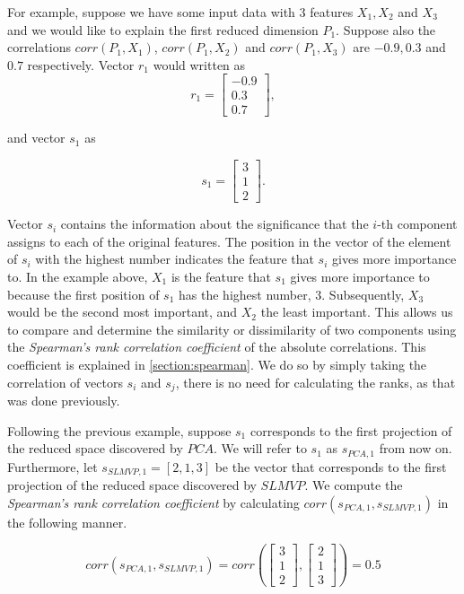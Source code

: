 For example, suppose we have some input data with 3 features $X_1, X_2$ and $X_3$ and we would like to explain the first reduced dimension $P_1$. Suppose also the correlations $corr(P_1, X_1)$, $corr(P_1, X_2)$ and $corr(P_1, X_3)$ are $-0.9, 0.3$ and $0.7$ respectively. Vector $r_1$ would written as
$$
    r_1 =
    \begin{bmatrix}
        -0.9 \\
        0.3  \\
        0.7
    \end{bmatrix},
$$

and vector $s_1$ as

$$
    s_1 =
    \begin{bmatrix}
        3 \\
        1 \\
        2
    \end{bmatrix}.
$$

Vector $s_i$ contains the information about the significance that the $i$-th component assigns to each of the original features. The position in the vector of the element of $s_i$ with the highest number indicates the feature that $s_i$ gives more importance to. In the example above, $X_1$ is the feature that $s_1$ gives more importance to because the first position of $s_1$ has the highest number, $3$. Subsequently, $X_3$ would be the second most important, and $X_2$ the least important. This allows us to compare and determine the similarity or dissimilarity of two components using the \textit{Spearman's rank correlation coefficient} of the absolute correlations. This coefficient is explained in \ref{section:spearman}. We do so by simply taking the correlation of vectors $s_i$ and $s_j$, there is no need for calculating the ranks, as that was done previously.

Following the previous example, suppose $s_1$ corresponds to the first projection of the reduced space discovered by $PCA$. We will refer to $s_1$ as $s_{PCA,1}$ from now on. Furthermore, let $s_{SLMVP,1} = [ 2, 1, 3 ]$ be the vector that corresponds to the first projection of the reduced space discovered by $SLMVP$. We compute the \textit{Spearman's rank correlation coefficient} by calculating $corr(s_{PCA,1}, s_{SLMVP,1})$ in the following manner.

$$
    corr(s_{PCA,1}, s_{SLMVP,1}) =
    corr \left(
    \begin{bmatrix}
            3 \\
            1 \\
            2
        \end{bmatrix},
    \begin{bmatrix}
            2 \\
            1 \\
            3
        \end{bmatrix}
    \right) = 0.5
$$

